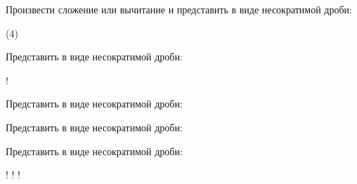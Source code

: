\begin{class}[number=4]
	\begin{listofex}
	\item Произвести сложение или вычитание и представить в виде несократимой дроби:
	\begin{tasks}(4)
		\task {}
		\task {}
		\task {}
		\task {}
	\end{tasks}
	\item Представить в виде несократимой дроби:
	\begin{itasks}[3]
		\task {}
		\task {}
		\task! 
		\task {}
		\task {}
		\task {}
	\end{itasks}
	\item Представить в виде несократимой дроби:
	\begin{itasks}[3]
		\task {}
		\task {}
		\task {}
		\task {}
		\task {}
	\end{itasks}
	\item Представить в виде несократимой дроби:
	\begin{itasks}[2]
		\task {}
		\task {}
		\task {}
		\task {}
	\end{itasks}
	\item Представить в виде несократимой дроби:
	\begin{itasks}[2]
		\task {}
		\task {}
		\task! 
		\task {}
		\task {}
		\task {}
		\task! 
		\task {}
		\task! 
		\task {}
	\end{itasks}
	\end{listofex}
\end{class}

